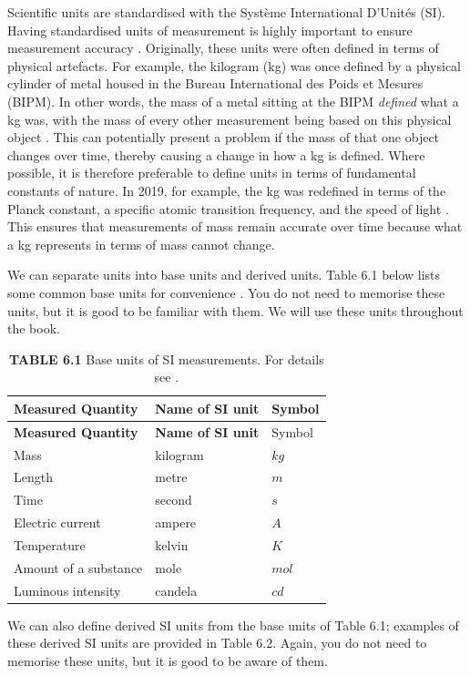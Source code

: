 \documentclass[
  openany]{krantz}
\begin{document}
Scientific units are standardised with the Système International D'Unités (SI).
Having standardised units of measurement is highly important to ensure measurement accuracy \citep{Quinn1995}.
Originally, these units were often defined in terms of physical artefacts.
For example, the kilogram (kg) was once defined by a physical cylinder of metal housed in the Bureau International des Poids et Mesures (BIPM).
In other words, the mass of a metal sitting at the BIPM \emph{defined} what a kg was, with the mass of every other measurement being based on this physical object \citep{Quinn1995, Freedman2011}.
This can potentially present a problem if the mass of that one object changes over time, thereby causing a change in how a kg is defined.
Where possible, it is therefore preferable to define units in terms of fundamental constants of nature.
In 2019, for example, the kg was redefined in terms of the Planck constant, a specific atomic transition frequency, and the speed of light \citep{Stock2019}.
This ensures that measurements of mass remain accurate over time because what a kg represents in terms of mass cannot change.

We can separate units into base units and derived units.
Table 6.1 below lists some common base units for convenience \citep{Quinn1995}.
You do not need to memorise these units, but it is good to be familiar with them.
We will use these units throughout the book.

\begin{longtable}[]{@{}lll@{}}
\caption{\textbf{TABLE 6.1} Base units of SI measurements. For details see \citet{Quinn1995}.}\tabularnewline
\toprule
\textbf{Measured Quantity} & \textbf{Name of SI unit} & Symbol \\
\midrule
\endfirsthead
\toprule
\textbf{Measured Quantity} & \textbf{Name of SI unit} & Symbol \\
\midrule
\endhead
Mass & kilogram & \(kg\) \\
Length & metre & \(m\) \\
Time & second & \(s\) \\
Electric current & ampere & \(A\) \\
Temperature & kelvin & \(K\) \\
Amount of a substance & mole & \(mol\) \\
Luminous intensity & candela & \(cd\) \\
\bottomrule
\end{longtable}

We can also define derived SI units from the base units of Table 6.1; examples of these derived SI units are provided in Table 6.2.
Again, you do not need to memorise these units, but it is good to be aware of them.
\end{document}
